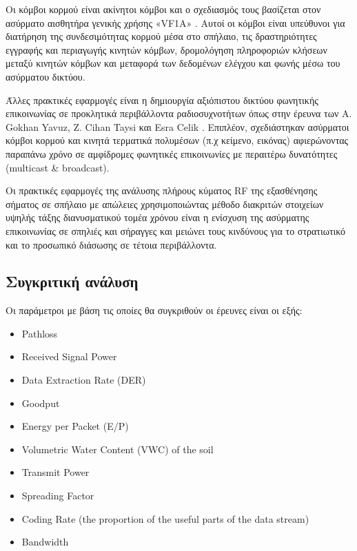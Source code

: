 \documentclass[12pt, greek]{article}
\begin{document}
\begin{multicols*}{2}
        Οι κόμβοι κορμού είναι ακίνητοι
        κόμβοι και ο σχεδιασμός τους βασίζεται στον ασύρματο αισθητήρα γενικής
        χρήσης «VF1A» \cite{walsh_communications_2018}.
        Αυτοί οι κόμβοι είναι υπεύθυνοι για διατήρηση της συνδεσιμότητας κορμού μέσα 
        στο σπήλαιο, τις δραστηριότητες
        εγγραφής και περιαγωγής κινητών κόμβων, δρομολόγηση πληροφοριών κλήσεων μεταξύ
        κινητών κόμβων και μεταφορά των δεδομένων ελέγχου και φωνής μέσω του ασύρματου
        δικτύου.

        Άλλες πρακτικές εφαρμογές είναι η δημιουργία αξιόπιστου δικτύου φωνητικής επικοινωνίας
        σε προκλητικά περιβάλλοντα ραδιοσυχνοτήτων όπως στην έρευνα των A. Gokhan Yavuz, 
        Z. Cihan Taysi και Esra Celik \cite{yavuz_-cave_2009}. Επιπλέον, σχεδιάστηκαν
        ασύρματοι κόμβοι κορμού και κινητά τερματικά πολυμέσων (π.χ κείμενο, εικόνας) 
        αφιερώνοντας παραπάνω χρόνο σε αμφίδρομες φωνητικές επικοινωνίες με περαιτέρω
        δυνατότητες (multicast \& broadcast).

        Οι πρακτικές εφαρμογές της ανάλυσης πλήρους κύματος RF της εξασθένησης σήματος σε σπήλαιο
        με απώλειες χρησιμοποιώντας μέθοδο διακριτών στοιχείων υψηλής τάξης διανυσματικού τομέα
        χρόνου \cite{pingenot_full_2005} είναι η ενίσχυση της ασύρματης επικοινωνίας σε σπηλιές
        και σήραγγες και μειώνει τους κινδύνους για το στρατιωτικό και το προσωπικό διάσωσης σε τέτοια
        περιβάλλοντα.

    \subsection{\normalsize \textsf{Συγκριτική ανάλυση}}
        Οι παράμετροι με βάση τις οποίες θα συγκριθούν οι έρευνες είναι οι εξής:
            \begin{itemize}
                \item Pathloss
                \item Received Signal Power
                \item Data Extraction Rate (DER)
                \item Goodput
                \item Energy per Packet (E/P)
                \item Volumetric Water Content (VWC) of the soil
                \item Transmit Power
                \item Spreading Factor
                \item Coding Rate (the proportion of the useful
                parts of the data stream)
                \item Bandwidth
            \end{itemize}


\end{multicols*}
\end{document}
